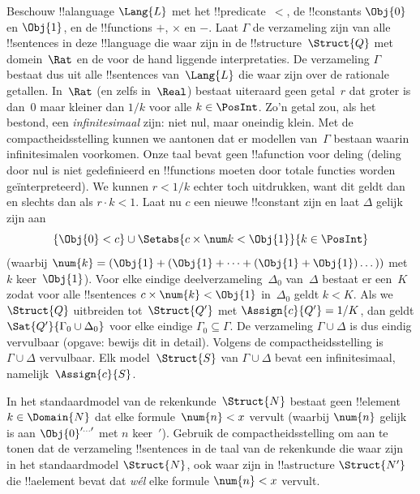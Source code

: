 \documentclass[openany]{memoir}
\begin{document}
{\begin{ex}
Beschouw !!a{language} $\Lang{L}$ met het !!{predicate}~$<$, de
!!{constant}s $\Obj{0}$ en $\Obj{1}$, en de !!{function}s $+$, $\times$
en $-$. Laat $\Gamma$ de verzameling zijn van alle !!{sentence}s in deze
!!{language} die waar zijn in de !!{structure}~$\Struct{Q}$ met
domein~$\Rat$ en de voor de hand liggende interpretaties. De verzameling
$\Gamma$ bestaat dus uit alle !!{sentence}s van~$\Lang{L}$ die waar zijn
over de rationale getallen. In~$\Rat$ (en zelfs in~$\Real$) bestaat
uiteraard geen getal~$r$ dat groter is dan~$0$ maar kleiner dan $1/k$
voor alle $k \in \PosInt$. Zo'n getal zou, als het bestond, een
\emph{infinitesimaal} zijn: niet nul, maar oneindig klein. Met de
compactheidsstelling kunnen we aantonen dat er modellen van~$\Gamma$
bestaan waarin infinitesimalen voorkomen. Onze taal bevat geen
!!a{function} voor deling (deling door nul is niet gedefinieerd en
!!{function}s moeten door totale functies worden geïnterpreteerd). We
kunnen $r < 1/k$ echter toch uitdrukken, want dit geldt dan en slechts
dan als $r \cdot k < 1$. Laat nu $c$ een nieuwe !!{constant} zijn en
laat $\Delta$ gelijk zijn aan
\[
\{\Obj{0} < c\}
\cup \Setabs{ c \times \num k < \Obj{1} }{k \in \PosInt}
\]
(waarbij $\num{k} = (\Obj{1} + (\Obj{1} + \dots + (\Obj{1} +
\Obj{1})\dots))$ met $k$ keer~$\Obj{1}$). Voor elke eindige
deelverzameling~$\Delta_0$ van~$\Delta$ bestaat er een~$K$ zodat voor
alle !!{sentence}s $c \times \num{k} < \Obj{1}$ in~$\Delta_0$ geldt
$k < K$. Als we $\Struct{Q}$ uitbreiden tot~$\Struct{Q'}$ met
$\Assign{c}{Q'} = 1/K$, dan geldt $\Sat{Q'}{\Gamma_0 \cup \Delta_0}$
voor elke eindige $\Gamma_0 \subseteq \Gamma$. De verzameling
$\Gamma \cup \Delta$ is dus eindig vervulbaar (opgave: bewijs dit in
detail). Volgens de compactheidsstelling is $\Gamma \cup \Delta$
vervulbaar. Elk model~$\Struct{S}$ van $\Gamma \cup \Delta$ bevat een
infinitesimaal, namelijk~$\Assign{c}{S}$.
\end{ex}
}{}

\begin{prob}
In het standaardmodel van de rekenkunde~$\Struct{N}$ bestaat geen
!!{element}~$k \in \Domain{N}$ dat elke formule~$\num{n} < x$ vervult
(waarbij $\num{n}$ gelijk is aan $\Obj{0}^{\prime\dots\prime}$ met $n$
keer~$\prime$). Gebruik de compactheidsstelling om aan te tonen dat de
verzameling !!{sentence}s in de taal van de rekenkunde die waar zijn in
het standaardmodel $\Struct{N}$, ook waar zijn in !!a{structure}
$\Struct{N'}$ die !!a{element} bevat dat \emph{wél} elke formule
$\num{n} < x$ vervult.
\end{prob}
\tagendprob
\end{document}
